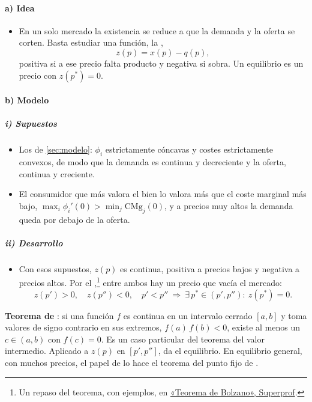 \documentclass[11pt]{article}
\begin{document}
\paragraph{a) Idea}

\begin{itemize}
\item En un solo mercado la existencia se reduce a que la demanda y la oferta se corten. Basta estudiar una función, la ,
  \begin{equation}
  z(p)=x(p)-q(p), \label{eq:exceso-demanda}
  \end{equation}
  positiva si a ese precio falta producto y negativa si sobra. Un equilibrio es un precio con $z(p^*)=0$.
\end{itemize}

\paragraph{b) Modelo}

\subparagraph{i) Supuestos}

\begin{itemize}
\item Los de \ref{sec:modelo}: $\phi_i$ estrictamente cóncavas y costes estrictamente convexos, de modo que la demanda es continua y decreciente y la oferta, continua y creciente.
\item El consumidor que más valora el bien lo valora más que el coste marginal más bajo, $\max_i\phi_i'(0)>\min_j\mathrm{CMg}_j(0)$, y a precios muy altos la demanda queda por debajo de la oferta.
\end{itemize}

\subparagraph{ii) Desarrollo}

\begin{itemize}
\item Con esos supuestos, $z(p)$ es continua, positiva a precios bajos y negativa a precios altos. Por el ,\footnote{Un repaso del teorema, con ejemplos, en \href{https://www.superprof.es/apuntes/escolar/matematicas/calculo/derivadas/teorema-de-bolzano.html}{«Teorema de Bolzano», Superprof}.} entre ambos hay un precio que vacía el mercado:
  $$z(p')>0,\quad z(p'')<0,\quad p'<p''\ \Longrightarrow\ \exists\,p^*\in(p',p''):\ z(p^*)=0.$$
\end{itemize}

\begin{anotaciones}
\textbf{Teorema de }\nocite{Bolzano1817Beweis,SydsaeterEtAl2008Further}: si una función $f$ es continua en un intervalo cerrado $[a,b]$ y toma valores de signo contrario en sus extremos, $f(a)\,f(b)<0$, existe al menos un $c\in(a,b)$ con $f(c)=0$. Es un caso particular del teorema del valor intermedio. Aplicado a $z(p)$ en $[p',p'']$, da el equilibrio. En equilibrio general, con muchos precios, el papel de  lo hace el teorema del punto fijo de  .
\end{anotaciones}
\end{document}
